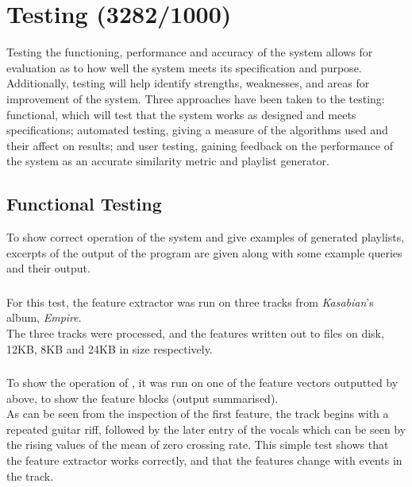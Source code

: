 \newcommand{\graph}[2]{
\begin{figure}[!hp]
	\caption{#2}
	\texttt{[image: testing/graphs/\#1]}
	\label{graph:#1}
\end{figure}}
\chapter{Testing (3282/1000)}
\label{text:testing}
Testing the functioning, performance and accuracy of the system allows for evaluation as to how well the system meets its specification and purpose. Additionally, testing will help identify strengths, weaknesses, and areas for improvement of the system. Three approaches have been taken to the testing: functional, which will test that the system works as designed and meets specifications; automated testing, giving a measure of the algorithms used and their affect on results; and user testing, gaining feedback on the performance of the system as an accurate similarity metric and playlist generator.
\section{Functional Testing}
\label{text:testing:functional}
To show correct operation of the system and give examples of generated playlists, excerpts of the output of the program are given along with some example queries and their output.
\subsection{}
For this test, the feature extractor was run on three tracks from \emph{Kasabian}'s album, \emph{Empire}.\\

The three tracks were processed, and the features written out to files on disk, 12KB, 8KB and 24KB in size respectively.
\subsection{}
To show the operation of , it was run on one of the feature vectors outputted by  above, to show the feature blocks (output summarised).\\

As can be seen from the inspection of the first feature, the track begins with a repeated guitar riff, followed by the later entry of the vocals which can be seen by the rising values of the mean of zero crossing rate. This simple test shows that the feature extractor works correctly, and that the features change with events in the track.
